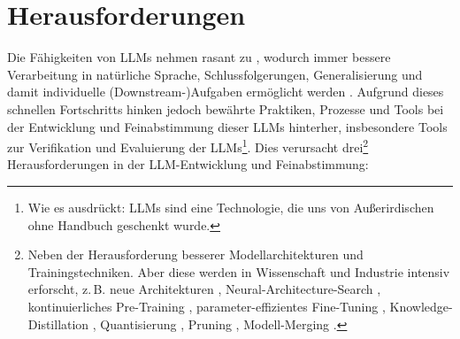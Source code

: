 \documentclass[twocolumn]{article}
\begin{document}
\section{Herausforderungen}

Die Fähigkeiten von LLMs nehmen rasant zu \cite{Minaee24}, wodurch immer bessere Verarbeitung in natürliche Sprache,
Schlussfolgerungen, Generalisierung und damit individuelle (Downstream-)Aufgaben ermöglicht werden \cite{Kaplan20}.
Aufgrund dieses schnellen Fortschritts hinken jedoch bewährte Praktiken, Prozesse und Tools
bei der Entwicklung und Feinabstimmung dieser LLMs hinterher,
insbesondere Tools zur Verifikation und Evaluierung der LLMs\footnote{Wie \cite{Gra23} es ausdrückt: LLMs sind eine Technologie, die uns von Außerirdischen ohne Handbuch geschenkt wurde.}.
Dies verursacht drei\footnote{Neben der Herausforderung besserer Modellarchitekturen und Trainingstechniken. Aber diese werden in Wissenschaft und Industrie intensiv erforscht, z.\,B. neue Architekturen \cite{Hasani22, Patro24, Merrill24, Fu24, Ma24, Sun24}, Neural-Architecture-Search \cite{Ren21, Saad24}, kontinuierliches Pre-Training \cite{Ke23}, parameter-effizientes Fine-Tuning \cite{Liu22}, Knowledge-Distillation \cite{Xu24}, Quantisierung \cite{Dettmers22}, Pruning \cite{Cheng24}, Modell-Merging \cite{Akiba24}.}
Herausforderungen in der LLM-Entwicklung und Feinabstimmung:
\end{document}
